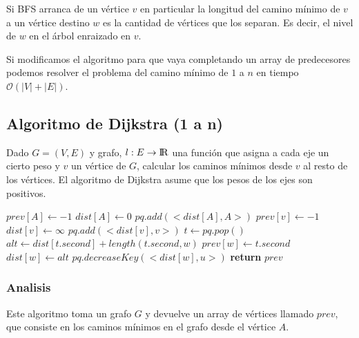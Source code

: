 Si BFS arranca de un v\'ertice $v$ en particular la longitud del camino m\'inimo de $v$ a un v\'ertice destino $w$ es la cantidad de v\'ertices que los separan. Es decir, el nivel de $w$ en el \'arbol enraizado en $v$.

Si modificamos el algoritmo para que vaya completando un array de predecesores podemos resolver el problema del camino m\'inimo de $1$ a $n$ en tiempo $\mathcal{O}(|V| + |E|)$.

\newpage
\subsection{Algoritmo de Dijkstra (1 a n)}

Dado $G = (V, E)$ y grafo, $l: E \rightarrow {\rm I\!R}$ una funci\'on que asigna a cada eje un cierto peso y $v$ un v\'ertice de $G$, calcular los caminos m\'inimos desde $v$ al resto de los v\'ertices. El algoritmo de Dijkstra asume que los pesos de los ejes son positivos.

\begin{algorithm}
\begin{algorithmic}[1]
  \State $prev[A] \gets -1$
  \State $dist[A] \gets 0$
  \State $pq.add(<dist[A], A>)$
    \State $prev[v] \gets -1$
    \State $dist[v] \gets \infty$
    \State $pq.add(<dist[v], v>)$
  \EndFor
    \State $t \gets pq.pop()$
      \State $alt \gets dist[t.second] + length(t.second, w)$
        \State $prev[w] \gets t.second$
        \State $dist[w] \gets alt$
        \State $pq.decreaseKey(<dist[w], u>)$
      \EndIf
    \EndFor
  \EndWhile
  \State \textbf{return} $prev$
\EndFunction
\end{algorithmic}
\end{algorithm}

\subsubsection*{Analisis}

Este algoritmo toma un grafo $G$ y devuelve un array de v\'ertices llamado $prev$, que consiste en los caminos m\'inimos en el grafo desde el v\'ertice $A$.

